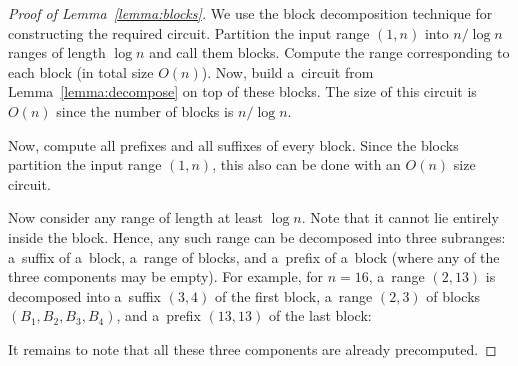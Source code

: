 \documentclass[11pt,letterpaper]{article}
\begin{document}
\begin{proof}[Proof of Lemma~\ref{lemma:blocks}]
We use the block decomposition technique for
constructing the required circuit.
Partition the input range $(1,n)$ into $n/\log n$ ranges
of length $\log n$ and call them blocks. Compute the range
corresponding to each block (in total size $O(n)$).
Now, build a~circuit from Lemma~\ref{lemma:decompose} on
top of these blocks. The size of this circuit is $O(n)$ since the
number of blocks is $n/\log n$.

Now, compute all prefixes and all suffixes of every block. Since
the blocks partition the input range $(1,n)$, this also can be done
with an $O(n)$ size circuit.

Now consider any range of length at least $\log n$. Note that it
cannot lie entirely inside the block. Hence, any such range can be
decomposed into three subranges: a~suffix of a~block, a~range
of blocks, and a~prefix of a~block
(where any of the three components may be empty). For example, for $n=16$,
a~range $(2,13)$ is decomposed into a~suffix $(3,4)$ of the
first block,
a~range $(2,3)$ of blocks $(B_1, B_2, B_3, B_4)$, and a~prefix $(13,13)$ of
the last block:
\begin{center}
\end{center}
It remains to note that all these three components are already precomputed.
\end{proof}
\end{document}
